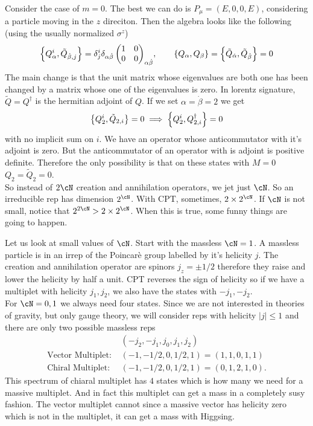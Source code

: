 \documentclass[11pt]{article}
\theoremstyle{definition}
\numberwithin{equation}{section}
\begin{document}
Consider the case of $m=0$. The best we can do is $P_{\mu}=(E,0,0,E)$, considering a particle moving in the $z$ direciton. Then the algebra looks like the following (using the usually normalized $\sigma^{z}$)
\begin{equation}
	\acomm{Q_{\alpha}^{i}}{\tilde{Q}_{\dot\beta,j}}=\delta^{i}_{j}\delta_{\alpha\dot\beta}\,\mqty(1&0\\0&0)_{\alpha\dot\beta},\qquad \acomm{Q_{\alpha}}{Q_{\beta}}=\acomm{\tilde{Q}_{\dot\alpha}}{\tilde{Q}_{\dot\beta}}=0
\end{equation}
The main change is that the unit matrix whose eigenvalues are both one has been changed by a matrix whose one of the eigenvalues is zero. In lorentz signature, $\tilde{Q}=Q^{\dagger}$ is the hermitian adjoint of $Q$. If we set $\alpha=\dot\beta=2$ we get
\begin{equation}
	\acomm{Q_{2}^{i}}{\tilde{Q}_{2,i}}=0\implies \acomm{Q_{2}^{i}}{Q^{\dagger}_{2,i}}=0
\end{equation}
with no implicit sum on $i$. We have an operator whose anticommutator with it's adjoint is zero. But the anticommutator of an operator with is adjoint is positive definite. Therefore the only possibility is that on these states with $M=0$ $Q_{2}=\tilde{Q}_{2}=0$.\\
So instead of $2\cN$ creation and annihilation operators, we jet just $\cN$. So an irreducible rep has dimension $2^{\cN}$. With CPT, sometimes, $2\times 2^{\cN}$. If $\cN$ is not small, notice that $2^{2\cN}>2\times 2^{\cN}$. When this is true, some funny things are going to happen.

Let us look at small values of $\cN$. Start with the massless $\cN=1$. A massless particle is in an irrep of the Poincarè group labelled by it's helicity $j$.
The creation and annihilation operator are spinors $j_{z}=\pm 1/2$ therefore they raise and lower the helicity by half a unit. CPT reverses the sign of helicity so if we have a multiplet with helicity $j_{1},j_{2}$, we also have the states with $-j_{1},-j_{2}$.\\
For $\cN=0,1$ we always need four states. Since we are not interested in theories of gravity, but only gauge theory, we will consider reps with helicity $|j|\le1$ and there are only two possible massless reps
\begin{equation}
\begin{split}
	&(-j_{2},-j_{1},j_{0},j_{1},j_{2})\\
	\text{Vector Multiplet: }&(-1,-1/2,0,1/2,1)=(1,1,0,1,1)\\
	\text{Chiral Multiplet: }&(-1,-1/2,0,1/2,1)=(0,1,2,1,0).
\end{split}
\end{equation}
This spectrum of chiaral multiplet has $4$ states which is how many we need for a massive multiplet. And in fact this multiplet can get a mass in a completely susy fashion. The vector multiplet cannot since a massive vector has helicity zero which is not in the multiplet, it can get a mass with Higgsing.
\end{document}
